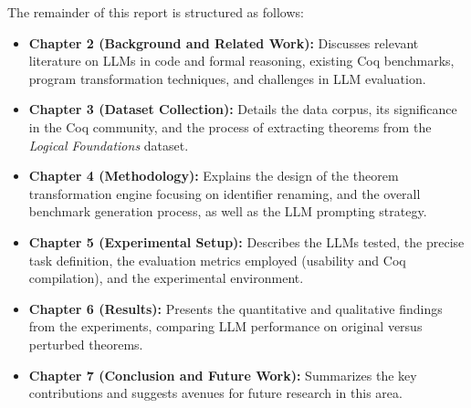 The remainder of this report is structured as follows:
\begin{itemize}
    \item \textbf{Chapter 2 (Background and Related Work):} Discusses relevant literature on LLMs in code and formal reasoning, existing Coq benchmarks, program transformation techniques, and challenges in LLM evaluation.
    \item \textbf{Chapter 3 (Dataset Collection):} Details the data corpus, its significance in the Coq community, and the process of extracting theorems from the \emph{Logical Foundations} dataset.
    \item \textbf{Chapter 4 (Methodology):} Explains the design of the theorem transformation engine focusing on identifier renaming, and the overall benchmark generation process, as well as the LLM prompting strategy.
    \item \textbf{Chapter 5 (Experimental Setup):} Describes the LLMs tested, the precise task definition, the evaluation metrics employed (usability and Coq compilation), and the experimental environment.
    \item \textbf{Chapter 6 (Results):} Presents the quantitative and qualitative findings from the experiments, comparing LLM performance on original versus perturbed theorems.
    \item \textbf{Chapter 7 (Conclusion and Future Work):} Summarizes the key contributions and suggests avenues for future research in this area.
\end{itemize}